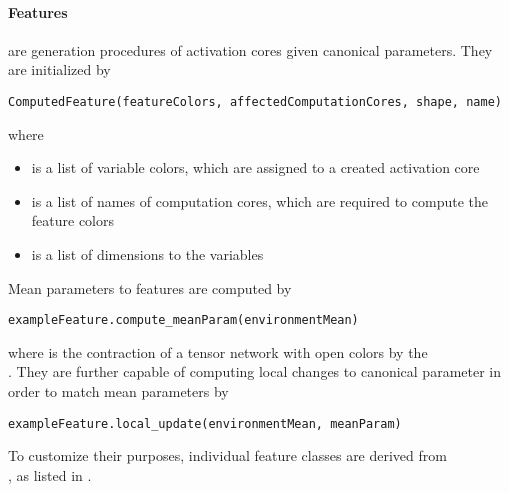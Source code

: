 \paragraph{Features} are generation procedures of activation cores given canonical parameters.
They are initialized by
\begin{lstlisting}
ComputedFeature(featureColors, affectedComputationCores, shape, name)
\end{lstlisting}
where
\begin{itemize}
    \item {} is a list of  variable colors, which are assigned to a created activation core
    \item {} is a list of  names of computation cores, which are required to compute the feature colors
    \item {} is a list of  dimensions to the variables
\end{itemize}
Mean parameters to features are computed by
\begin{lstlisting}
exampleFeature.compute_meanParam(environmentMean)
\end{lstlisting}
where  is the contraction of a tensor network with open colors by the \\
.
They are further capable of computing local changes to canonical parameter in order to match mean parameters by
\begin{lstlisting}
exampleFeature.local_update(environmentMean, meanParam)
\end{lstlisting}
To customize their purposes, individual feature classes are derived from \\
, as listed in .

